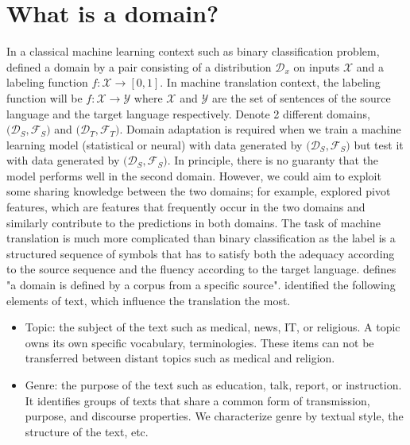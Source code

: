 \section{What is a domain?}
\label{sec:domain}
In a classical machine learning context such as binary classification problem, \citet{Shai10A} defined a domain by a pair consisting of a distribution $\mathcal{D}_x$ on inputs $\mathcal{X}$ and a labeling function $f: \mathcal{X} \rightarrow [0,1]$. In machine translation context, the labeling function will be $f: \mathcal{X} \rightarrow \mathcal{Y}$ where $\mathcal{X}$ and $\mathcal{Y}$ are the set of sentences of the source language and the target language respectively. Denote 2 different domains, $\big( \mathcal{D}_S, \mathcal{F}_S \big)$ and $\big( \mathcal{D}_T, \mathcal{F}_T \big)$. Domain adaptation is required when we train a machine learning model (statistical or neural) with data generated by $\big(\mathcal{D}_S, \mathcal{F}_S \big)$ but test it with data generated by $\big(\mathcal{D}_S, \mathcal{F}_S \big)$. In principle, there is no guaranty that the model performs well in the second domain. However, we could aim to exploit some sharing knowledge between the two domains; for example, \citet{Blitzer06Domain} explored pivot features, which are features that frequently occur in the two domains and similarly contribute to the predictions in both domains. The task of machine translation is much more complicated than binary classification as the label is a structured sequence of symbols that has to satisfy both the adequacy according to the source sequence and the fluency according to the target language.\citet{koehn17six} defines "a domain is defined by a corpus from a specific source". \citet{Wees15Whats,Wees17Whats} identified the following elements of text, which influence the translation the most.
\begin{itemize}
	\item Topic: the subject of the text such as medical, news, IT, or religious. A topic owns its own specific vocabulary, terminologies. These items can not be transferred between distant topics such as medical and religion.
	\item Genre: the purpose of the text such as education, talk, report, or instruction. It identifies groups of texts that share a common form of transmission, purpose, and discourse properties. We characterize genre by textual style, the structure of the text, etc.
\end{itemize}

